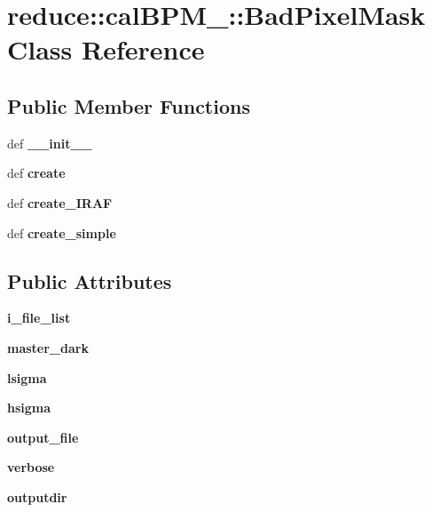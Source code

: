 \section{reduce::cal\-BPM\_::Bad\-Pixel\-Mask Class Reference}
\label{classreduce_1_1calBPM__2_1_1BadPixelMask}
\subsection*{Public Member Functions}
\begin{CompactItemize}
\item 
def \textbf{\_\-\_\-init\_\-\_\-}\label{classreduce_1_1calBPM__2_1_1BadPixelMask_74812920485d6252aef87e07a3adf6ae}

\item 
def \textbf{create}\label{classreduce_1_1calBPM__2_1_1BadPixelMask_ee5db4b16eb5b1a56944fc4e828178da}

\item 
def \textbf{create\_\-IRAF}\label{classreduce_1_1calBPM__2_1_1BadPixelMask_37292979133280b7d9cb99f580c161f7}

\item 
def \textbf{create\_\-simple}\label{classreduce_1_1calBPM__2_1_1BadPixelMask_a68a07eccd5c112703966fd2c09af0b5}

\end{CompactItemize}
\subsection*{Public Attributes}
\begin{CompactItemize}
\item 
\textbf{i\_\-file\_\-list}\label{classreduce_1_1calBPM__2_1_1BadPixelMask_55311dcf5e1817b91d83279352f2cb16}

\item 
\textbf{master\_\-dark}\label{classreduce_1_1calBPM__2_1_1BadPixelMask_0f35b5fd077797712561f22a3960f263}

\item 
\textbf{lsigma}\label{classreduce_1_1calBPM__2_1_1BadPixelMask_076dcf83c89649038b41482c04867c24}

\item 
\textbf{hsigma}\label{classreduce_1_1calBPM__2_1_1BadPixelMask_4096cde3808b15beb2e1c27009b65208}

\item 
\textbf{output\_\-file}\label{classreduce_1_1calBPM__2_1_1BadPixelMask_428c0437f3b4c8e028f0c2a30f97e59f}

\item 
\textbf{verbose}\label{classreduce_1_1calBPM__2_1_1BadPixelMask_203afe8b079e29df2ce8c1ada9984977}

\item 
\textbf{outputdir}\label{classreduce_1_1calBPM__2_1_1BadPixelMask_aba02ca18b18dfda3290ec37bd2dc401}

\end{CompactItemize}


